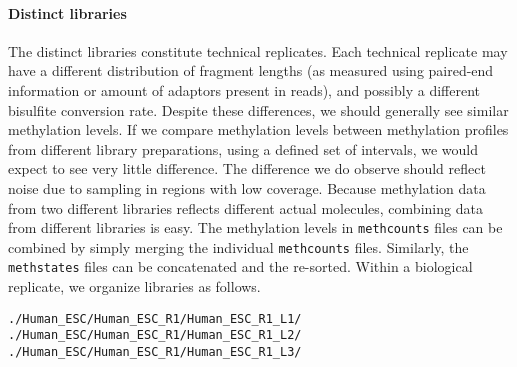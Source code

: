 \documentclass[10pt]{article}
\newcommand{\fn}[1]{\texttt{#1}}
\begin{document}
{{\paragraph{Distinct libraries}
The distinct libraries constitute technical replicates.  Each
technical replicate may have a different distribution of fragment
lengths (as measured using paired-end information or amount of
adaptors present in reads), and possibly a different bisulfite
conversion rate.  Despite these differences, we should generally see
similar methylation levels. If we compare methylation levels between
methylation profiles from different library preparations, using a
defined set of intervals, we would expect to see very little
difference. The difference we do observe should reflect noise due to
sampling in regions with low coverage.  Because methylation data from
two different libraries reflects different actual molecules, combining
data from different libraries is easy. The methylation levels in
\fn{methcounts} files can be combined by simply merging the individual
\fn{methcounts} files.  Similarly, the \fn{methstates} files can be
concatenated and the re-sorted. Within a biological replicate, we
organize libraries as follows.
\begin{verbatim}
./Human_ESC/Human_ESC_R1/Human_ESC_R1_L1/
./Human_ESC/Human_ESC_R1/Human_ESC_R1_L2/
./Human_ESC/Human_ESC_R1/Human_ESC_R1_L3/
\end{verbatim}

}}
\end{document}
